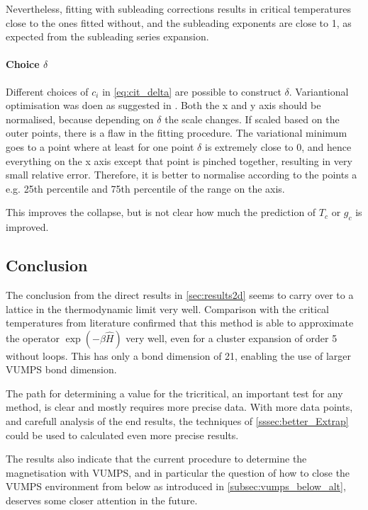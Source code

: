 Nevertheless, fitting with subleading corrections results in critical temperatures close to the ones fitted without, and the subleading exponents are close to 1, as expected from the subleading series expansion.

\paragraph{ Choice  $\delta$  }

Different choices of $c_i$ in \cref{eq:cit_delta} are possible to construct $\delta$.  Variantional optimisation was doen as suggested in \cite{Nietner2020}. Both the x and y axis should be normalised, because depending on $\delta$ the scale changes. If scaled based on the outer points, there is a flaw in the fitting procedure.  The variational minimum goes to a point where at least for one point $\delta$ is extremely close to 0, and hence everything on the x axis except that point is pinched together, resulting in very small relative error. Therefore, it is better to normalise according to the points a e.g. 25th percentile and 75th percentile of the range on the  axis.

This improves the collapse, but is not clear how much the prediction of $T_c$ or $g_c$ is improved.

\subsection{Conclusion}

The conclusion from the direct results in \cref{sec:results2d} seems to carry over to a lattice in the thermodynamic limit very well. Comparison with the critical temperatures from literature confirmed that this method is able to approximate the operator $\exp(-\beta \hat{H})$ very well, even for a cluster expansion of order 5 without loops. This has only a bond dimension of 21, enabling the use of larger VUMPS bond dimension.

The path for determining a value for the tricritical, an important test for any method, is clear and mostly requires more precise data. With more data points, and carefull analysis of the end results, the techniques of \cref{sssec:better_Extrap} could be used to calculated even more precise results.

The results also indicate that the current procedure to determine the magnetisation with VUMPS, and in particular the question of how to close the VUMPS environment from below as introduced in \cref{subsec:vumps_below_alt}, deserves some closer attention in the future.